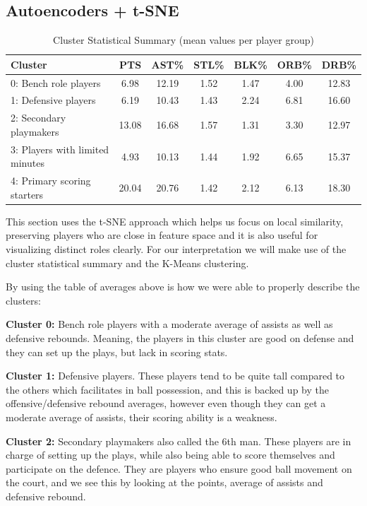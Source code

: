 \documentclass{article}
\begin{document}
\subsection{Autoencoders + t-SNE}

\begin{table}[h!]
\centering
\caption{Cluster Statistical Summary (mean values per player group)}
\label{tab:cluster_stats}
\begin{tabular}{lcccccc}
\toprule
\textbf{Cluster} & \textbf{PTS} & \textbf{AST\%} & \textbf{STL\%} & \textbf{BLK\%} & \textbf{ORB\%} & \textbf{DRB\%} \\
\midrule
0: Bench role players & 6.98 & 12.19 & 1.52 & 1.47 & 4.00 & 12.83 \\
1: Defensive players & 6.19 & 10.43 & 1.43 & 2.24 & 6.81 & 16.60 \\
2: Secondary playmakers & 13.08 & 16.68 & 1.57 & 1.31 & 3.30 & 12.97 \\
3: Players with limited minutes & 4.93 & 10.13 & 1.44 & 1.92 & 6.65 & 15.37 \\
4: Primary scoring starters & 20.04 & 20.76 & 1.42 & 2.12 & 6.13 & 18.30 \\
\bottomrule
\end{tabular}
\end{table}

This section uses the t-SNE approach which helps us focus on local similarity, preserving players who are close in feature space and it is also useful for visualizing distinct roles clearly. For our interpretation we will make use of the cluster statistical summary and the K-Means clustering.

By using the table of averages above is how we were able to properly describe the clusters:

{\bf Cluster 0:} Bench role players with a moderate average of assists as well as defensive rebounds. Meaning, the players in this cluster are good on defense and they can set up the plays, but lack in scoring stats.

{\bf Cluster 1:} Defensive players. These players tend to be quite tall compared to the others which facilitates in ball possession, and this is backed up by the offensive/defensive rebound averages, however even though they can get a moderate average of assists, their scoring ability is a weakness.

{\bf Cluster 2:} Secondary playmakers also called the 6th man. These players are in charge of setting up the plays, while also being able to score themselves and participate on the defence. They are players who ensure good ball movement on the court, and we see this by looking at the points, average of assists and defensive rebound. 
\end{document}
